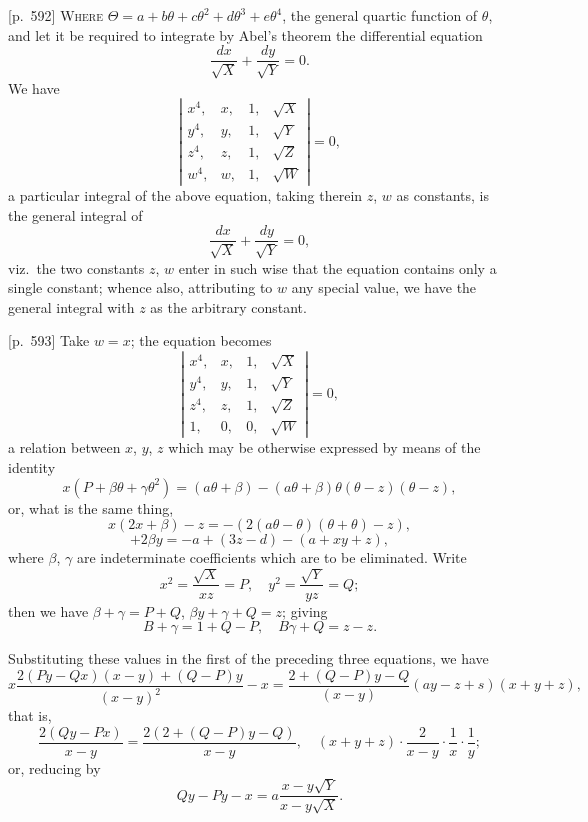 \documentclass[11pt,a4paper]{article}
\theoremstyle{plain}
\theoremstyle{definition}
\theoremstyle{remark}
\begin{document}
\bigskip

[p.~592] \textsc{Where} $\Theta = a + b\theta + c\theta^2 + d\theta^3 + e\theta^4$, the general quartic function of $\theta$, and let it be required to integrate by Abel's theorem the differential equation
\[
\frac{dx}{\sqrt{X}} + \frac{dy}{\sqrt{Y}} = 0.
\]
We have
\[
\left|
\begin{array}{cccc}
x^4, & x, & 1, & \sqrt{X} \\
y^4, & y, & 1, & \sqrt{Y} \\
z^4, & z, & 1, & \sqrt{Z} \\
w^4, & w, & 1, & \sqrt{W}
\end{array}
\right| = 0,
\]
a particular integral of the above equation, taking therein $z$, $w$ as constants, is the general integral of
\[
\frac{dx}{\sqrt{X}} + \frac{dy}{\sqrt{Y}} = 0,
\]
viz.\ the two constants $z$, $w$ enter in such wise that the equation contains only a single constant; whence also, attributing to $w$ any special value, we have the general integral with $z$ as the arbitrary constant.

\bigskip

[p.~593] Take $w = x$; the equation becomes
\[
\left|
\begin{array}{cccc}
x^4, & x, & 1, & \sqrt{X} \\
y^4, & y, & 1, & \sqrt{Y} \\
z^4, & z, & 1, & \sqrt{Z} \\
1, & 0, & 0, & \sqrt{W}
\end{array}
\right| = 0,
\]
a relation between $x$, $y$, $z$ which may be otherwise expressed by means of the identity
\[
x (P + \beta\theta + \gamma\theta^2) = (a\theta + \beta) - (a\theta + \beta) \theta (\theta - z) (\theta - z),
\]
or, what is the same thing,
\[
x (2x + \beta) - z = -(2(a\theta - \theta)(\theta + \theta) - z),
\]
\[
+ 2\beta y = -a + (3z - d) - (a + xy + z),
\]
where $\beta$, $\gamma$ are indeterminate coefficients which are to be eliminated. Write
\[
x^2 = \frac{\sqrt{X}}{x z} = P, \quad y^2 = \frac{\sqrt{Y}}{y z} = Q;
\]
then we have $\beta + \gamma = P + Q$, $\beta y + \gamma + Q = z$; giving
\[
B + \gamma = 1 + Q - P, \quad B\gamma + Q = z - z.
\]

Substituting these values in the first of the preceding three equations, we have
\[
x \frac{2(Py - Qx)(x - y) + (Q - P)y}{(x - y)^2} - x = \frac{2 + (Q - P)y - Q}{(x - y)} \left( a y - z + s \right) (x + y + z),
\]
that is,
\[
\frac{2(Qy - Px)}{x - y} = \frac{2(2 + (Q - P)y - Q)}{x - y}, \quad (x + y + z) \cdot \frac{2}{x - y} \cdot \frac{1}{x} \cdot \frac{1}{y};
\]
or, reducing by
\[
Qy - Py - x = a\frac{x - y\sqrt{Y}}{x - y \sqrt{X}}.
\]
\end{document}

